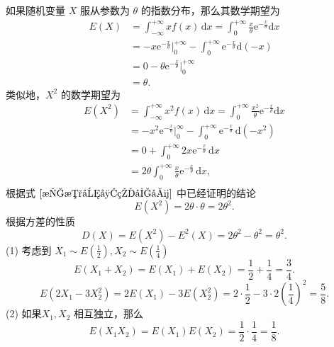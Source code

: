 \begin{solution}
    如果随机变量 $X$ 服从参数为 $\theta$ 的指数分布，那么其数学期望为
    \begin{equation}\label{指数分布的均值}
        \begin{aligned}
            E(X)
             & = \int_{-\infty}^{+\infty} xf(x) \,\mathrm{d}x = \int_{0}^{+\infty} \frac{x}{\theta}\mathrm{e}^{-\frac{x}{\theta}} \mathrm{d}x \\
             & = -x\mathrm{e}^{-\frac{x}{\theta}}\Big|_{0}^{+\infty} - \int_{0}^{+\infty} \mathrm{e}^{-\frac{x}{\theta}} \mathrm{d}(-x)       \\
             & = 0 - \theta\mathrm{e}^{-\frac{x}{\theta}}\Big|_{0}^{+\infty}                                                                  \\
             & = \theta.
        \end{aligned}
    \end{equation}
    类似地，$X^2$ 的数学期望为
    \begin{equation}
        \begin{aligned}
            E(X^2)
             & = \int_{-\infty}^{+\infty} x^2f(x) \,\mathrm{d}x
            = \int_{0}^{+\infty} \frac{x^2}{\theta}\mathrm{e}^{-\frac{x}{\theta}} \mathrm{d}x                                                \\
             & = -x^2\mathrm{e}^{-\frac{x}{\theta}}\Big|_{0}^{\infty} - \int_{0}^{+\infty} \mathrm{e}^{-\frac{x}{\theta}} \,\mathrm{d}(-x^2) \\
             & = 0 + \int_{0}^{+\infty} 2x\mathrm{e}^{-\frac{x}{\theta}} \,\mathrm{d}x                                                       \\
             & = 2\theta\int_{0}^{+\infty} \frac{x}{\theta}\mathrm{e}^{-\frac{x}{\theta}} \,\mathrm{d}x,                                     \\
        \end{aligned}
    \end{equation}
    根据式 $\eqref{指数分布的均值}$ 中已经证明的结论
    \begin{equation}
        E(X^2) = 2\theta \cdot \theta = 2\theta^2.
    \end{equation}
    根据方差的性质
    \begin{equation}\label{指数分布的方差}
        D(X) = E(X^2) - E^2(X) = 2\theta^2 - \theta^2 = \theta^2.
    \end{equation}
    (1) 考虑到 $X_1 \sim E\left(\frac{1}{2}\right), X_2 \sim E\left(\frac{1}{4}\right)$
    $$
        E(X_1+X_2) = E(X_1) + E(X_2) = \frac{1}{2} + \frac{1}{4} = \frac{3}{4}.
    $$
    $$
        E\left(2X_1 - 3X_2^2\right)
        = 2E(X_1) - 3E(X_2^2)
        = 2\cdot\frac{1}{2} - 3 \cdot 2\left(\frac{1}{4}\right)^2
        = \frac{5}{8}.
    $$
    (2) 如果$X_1,X_2$ 相互独立，那么
    $$
        E(X_1X_2) = E(X_1)E(X_2) = \frac{1}{2} \cdot \frac{1}{4} = \frac{1}{8}.
    $$
\end{solution}


